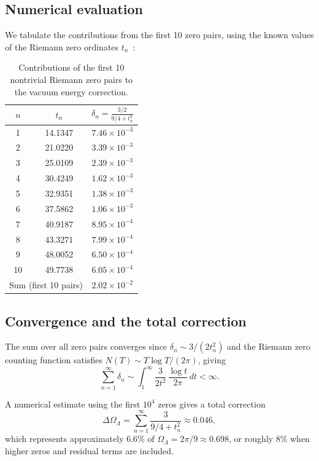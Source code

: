 \documentclass[12pt,a4paper]{article}
\newcommand{\OL}{\Omega_\Lambda}
\begin{document}
\subsection{Numerical evaluation}

We tabulate the contributions from the first 10 zero pairs, using the known values of the Riemann zero ordinates $t_n$~\cite{Odlyzko}:

\begin{table}[H]
\centering
\begin{tabular}{@{}ccc@{}}
\toprule
$n$ & $t_n$ & $\delta_n = \frac{3/2}{9/4 + t_n^2}$ \\
\midrule
1  & 14.1347 & $7.46 \times 10^{-3}$ \\
2  & 21.0220 & $3.39 \times 10^{-3}$ \\
3  & 25.0109 & $2.39 \times 10^{-3}$ \\
4  & 30.4249 & $1.62 \times 10^{-3}$ \\
5  & 32.9351 & $1.38 \times 10^{-3}$ \\
6  & 37.5862 & $1.06 \times 10^{-3}$ \\
7  & 40.9187 & $8.95 \times 10^{-4}$ \\
8  & 43.3271 & $7.99 \times 10^{-4}$ \\
9  & 48.0052 & $6.50 \times 10^{-4}$ \\
10 & 49.7738 & $6.05 \times 10^{-4}$ \\
\midrule
\multicolumn{2}{c}{Sum (first 10 pairs)} & $2.02 \times 10^{-2}$ \\
\bottomrule
\end{tabular}
\caption{Contributions of the first 10 nontrivial Riemann zero pairs to the vacuum energy correction.}
\label{tab:zeros}
\end{table}

\subsection{Convergence and the total correction}

The sum over all zero pairs converges since $\delta_n \sim 3/(2t_n^2)$ and the Riemann zero counting function satisfies $N(T) \sim T\log T/(2\pi)$, giving
\begin{equation}
  \sum_{n=1}^\infty \delta_n \sim \int_1^\infty \frac{3}{2t^2}\,\frac{\log t}{2\pi}\,dt < \infty.
\end{equation}

A numerical estimate using the first $10^4$ zeros gives a total correction
\begin{equation}\label{eq:total-correction}
  \Delta\OL = \sum_{n=1}^{\infty} \frac{3}{9/4 + t_n^2} \approx 0.046,
\end{equation}
which represents approximately $6.6\%$ of $\OL = 2\pi/9 \approx 0.698$, or roughly $8\%$ when higher zeros and residual terms are included.
\end{document}
